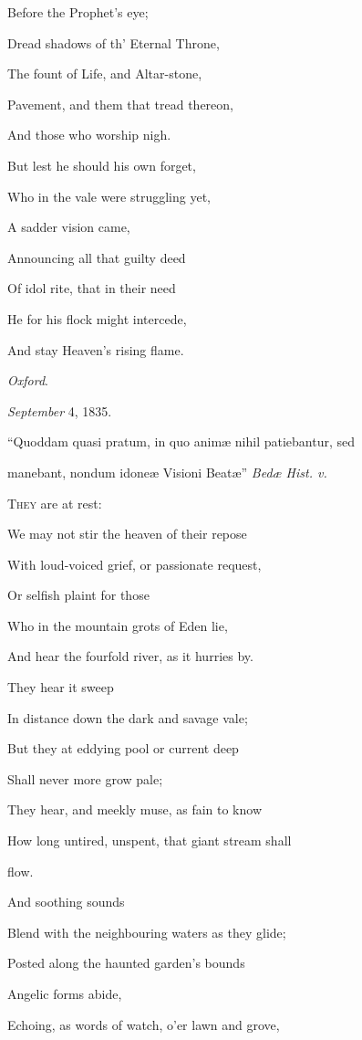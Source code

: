 Before the Prophet's eye;

Dread shadows of th' Eternal Throne,

The fount of Life, and Altar-stone,

Pavement, and them that tread thereon,

And those who worship
nigh. 

But lest he should his own forget,

Who in the vale were struggling yet,

A sadder vision came,

Announcing all that guilty deed

Of idol rite, that in their need

He for his flock might intercede,

And stay Heaven's rising
flame.

\emph{Oxford}.

\emph{September} 4, 1835.


``Quoddam quasi pratum, in quo animæ nihil
patiebantur, sed

manebant, nondum idoneæ Visioni Beatæ'' \emph{Bedæ
Hist. v.}

T\textsc{hey} are at rest:

We may not stir the heaven of their repose

With loud-voiced grief, or passionate request,

Or selfish plaint for those

Who in the mountain grots of Eden lie,

And hear the fourfold river, as it hurries by.

They hear it sweep

In distance down the dark and savage vale;

But they at eddying pool or current deep

Shall never more grow pale;

They hear, and meekly muse, as fain to know

How long untired, unspent, that giant stream shall

flow. 

And soothing sounds

Blend with the neighbouring waters as they glide;

Posted along the haunted garden's bounds

Angelic forms abide,

Echoing, as words of watch, o'er lawn and grove,

